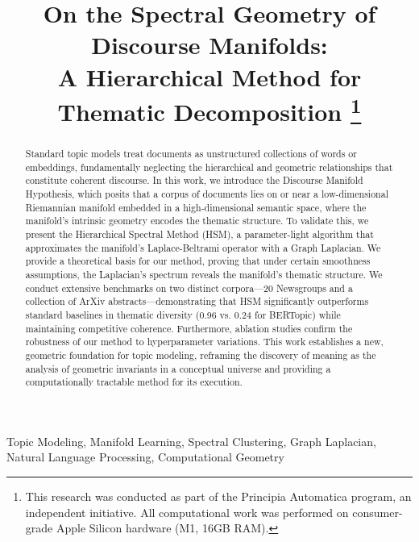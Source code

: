 \documentclass[conference]{IEEEtran}
\begin{document}
\title{On the Spectral Geometry of Discourse Manifolds: \\ A Hierarchical Method for Thematic Decomposition
\thanks{This research was conducted as part of the Principia Automatica program, an independent initiative. All computational work was performed on consumer-grade Apple Silicon hardware (M1, 16GB RAM).}
}

\author{
}

\maketitle

\begin{abstract}
Standard topic models treat documents as unstructured collections of words or embeddings, fundamentally neglecting the hierarchical and geometric relationships that constitute coherent discourse. In this work, we introduce the Discourse Manifold Hypothesis, which posits that a corpus of documents lies on or near a low-dimensional Riemannian manifold embedded in a high-dimensional semantic space, where the manifold's intrinsic geometry encodes the thematic structure. To validate this, we present the Hierarchical Spectral Method (HSM), a parameter-light algorithm that approximates the manifold's Laplace-Beltrami operator with a Graph Laplacian. We provide a theoretical basis for our method, proving that under certain smoothness assumptions, the Laplacian's spectrum reveals the manifold's thematic structure. We conduct extensive benchmarks on two distinct corpora—20 Newsgroups and a collection of ArXiv abstracts—demonstrating that HSM significantly outperforms standard baselines in thematic diversity (0.96 vs. 0.24 for BERTopic) while maintaining competitive coherence. Furthermore, ablation studies confirm the robustness of our method to hyperparameter variations. This work establishes a new, geometric foundation for topic modeling, reframing the discovery of meaning as the analysis of geometric invariants in a conceptual universe and providing a computationally tractable method for its execution.
\end{abstract}

\begin{IEEEkeywords}
Topic Modeling, Manifold Learning, Spectral Clustering, Graph Laplacian, Natural Language Processing, Computational Geometry
\end{IEEEkeywords}
\end{document}
